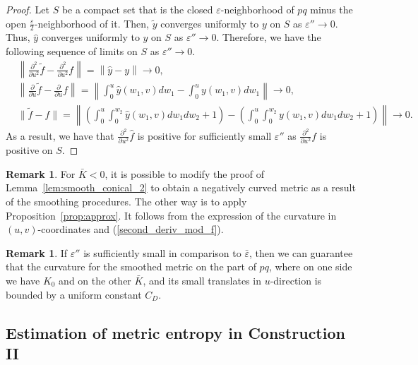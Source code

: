 \documentclass[12pt]{article}
\numberwithin{equation}{section}
\theoremstyle{definition}
\newtheorem{rem}[lem]{Remark}
\newcommand{\eps}{\varepsilon}
\begin{document}
\begin{proof}
Let $S$ be a compact set that is the closed $\eps$-neighborhood of $pq$ minus the open $\frac{\eps}{2}$-neighborhood of it. Then, $\tilde y$ converges uniformly to $y$ on $S$ as $\eps''\rightarrow 0$. Thus, $\hat y$ converges uniformly to $y$ on $S$ as $\eps''\rightarrow 0$. Therefore, we have the following sequence of limits on $S$ as $\eps''\rightarrow 0$.
\begin{align*}
&\left \| \frac{\partial^2}{\partial u^2}\tilde f- \frac{\partial^2}{\partial u^2}f \right \| = \left\| \hat y-y \right\| \rightarrow 0,\\
& \left \| \frac{\partial}{\partial u}\tilde f - \frac{\partial}{\partial u}f \right\| = \left\| \int_0^{u}\hat y(w_1,v)dw_1-\int_0^{u} y(w_1,v)dw_1\right\| \rightarrow 0,\\
&\| \tilde f-f \| = \left \| (\int_0^u\int_0^{w_2}\hat y(w_1,v)dw_1dw_2 + 1)-(\int_0^u\int_0^{w_2} y(w_1,v)dw_1dw_2 + 1)\right \| \rightarrow 0.
\end{align*}
As a result, we have that $\frac{\partial^2}{\partial u^2}\hat f$ is positive for sufficiently small $\eps''$ as $\frac{\partial^2}{\partial u^2}f$ is positive on $S$. 
\end{proof}

\begin{rem}
For $\bar K<0$, it is possible to modify the proof of Lemma~\ref{lem:smooth_conical_2} to obtain a negatively curved metric as a result of the smoothing procedures. The other way is to apply Proposition~\ref{prop:approx}. It follows from the expression of the curvature in $(u,v)$-coordinates and (\ref{second_deriv_mod_f}).
\end{rem}

\begin{rem}
If $\eps''$ is sufficiently small in comparison to $\bar\eps$, then we can guarantee that the curvature for the smoothed metric on the part of $pq$, where on one side we have $K_0$ and on the other $\bar K$, and its small translates in $u$-direction is bounded by a uniform constant $C_D$.
\end{rem}


\subsection{Estimation of metric entropy in Construction II}\label{metr_3}
\end{document}
